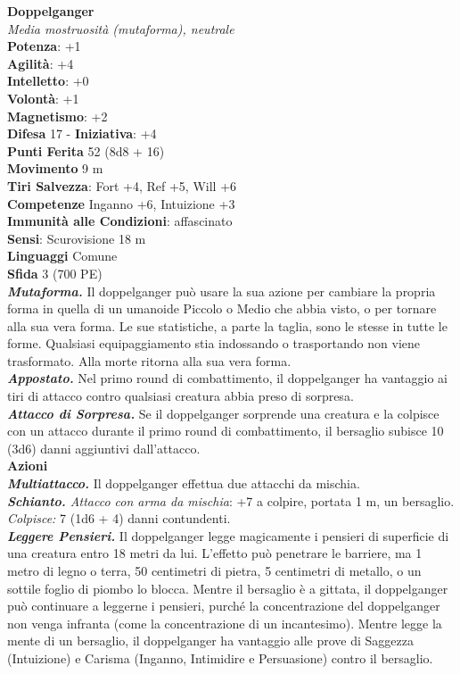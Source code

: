 \begin{multicols}{2}
\medskip\textbf{Doppelganger}\\
\emph{Media mostruosità (mutaforma), neutrale}\\
\textbf{Potenza}: +1\\
\textbf{Agilità}: +4\\
\textbf{Intelletto}: +0\\
\textbf{Volontà}: +1\\
\textbf{Magnetismo}: +2\\
\textbf{Difesa} 17 - \textbf{Iniziativa}: +4\\
\textbf{Punti Ferita} 52 (8d8 + 16)\\
\textbf{Movimento} 9 m\\
\textbf{Tiri Salvezza}: Fort +4, Ref +5, Will +6\\
\textbf{Competenze} Inganno +6, Intuizione +3\\
\textbf{Immunità alle Condizioni}: affascinato\\
\textbf{Sensi}: Scurovisione 18 m\\
\textbf{Linguaggi} Comune\\
\textbf{Sfida} 3 (700 PE)\smallskip\\
\emph{\textbf{Mutaforma.}} Il doppelganger può usare la sua azione per cambiare la propria forma in quella di un umanoide Piccolo o Medio che abbia visto, o per tornare alla sua vera forma. Le sue statistiche, a parte la taglia, sono le stesse in tutte le forme. Qualsiasi equipaggiamento stia indossando o trasportando non viene trasformato.  Alla morte ritorna alla sua vera forma.\\
\emph{\textbf{Appostato.}} Nel primo round di combattimento, il doppelganger ha vantaggio ai tiri di attacco contro qualsiasi creatura abbia preso di sorpresa.\\
\emph{\textbf{Attacco di Sorpresa.}} Se il doppelganger sorprende una creatura e la colpisce con un attacco durante il primo round di combattimento, il bersaglio subisce 10 (3d6) danni aggiuntivi dall'attacco.\\
\smallskip\textbf{Azioni}\\
\emph{\textbf{Multiattacco.}} Il doppelganger effettua due attacchi da mischia.\\
\emph{\textbf{Schianto.} Attacco con arma da mischia}: +7 a colpire, portata 1 m, un bersaglio.\\
\emph{Colpisce:} 7 (1d6 + 4) danni contundenti.\\
\emph{\textbf{Leggere Pensieri.}} Il doppelganger legge magicamente i pensieri di superficie di una creatura entro 18 metri da lui. L'effetto può penetrare le barriere, ma 1 metro di legno o terra, 50 centimetri di pietra, 5 centimetri di metallo, o un sottile foglio di piombo lo blocca. Mentre il bersaglio è a gittata, il doppelganger può continuare a leggerne i pensieri, purché la concentrazione del doppelganger non venga infranta (come la concentrazione di un incantesimo). Mentre legge la mente di un bersaglio, il doppelganger ha vantaggio alle prove di Saggezza (Intuizione) e Carisma (Inganno, Intimidire e Persuasione) contro il bersaglio.\\

\end{multicols}
